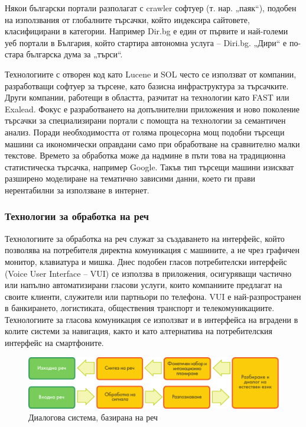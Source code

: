 \begin{multicols}{2}
  Някои български портали разполагат с crawler софтуер (т. нар.
   „паяк“), подобен на използвания от глобалните
   търсачки, който индексира сайтовете, класифицирани в
   категории. Например Dir.bg е един от първите и най-големи уеб портали в България, който стартира
   автономна услуга – Diri.bg. „Дири“ е по-стара българска дума за „търси“. 

  Технологиите с отворен код като
   Lucene и SOL често се използват от компании,
   разработващи софтуер за търсене, като базисна
   инфраструктура за търсачките. Други компании,
   работещи в областта, разчитат на технологии като FAST или Exalead.
  Фокус е разработването на допълнителни приложения и ново поколение търсачки за специализирани портали с помощта на технологии за семантичен анализ. Поради необходимостта от голяма процесорна мощ подобни търсещи машини са икономически оправдани само при обработване на сравнително малки текстове. Времето за обработка може да надмине в пъти това на традиционна статистическа търсачка, например Google. Такъв тип търсещи машини изискват разширено моделиране на тематично зависими данни, което ги прави нерентабилни за използване в интернет.

  \subsubsection{Технологии за обработка на реч}

  Технологиите за обработка на реч служат за създаването на интерфейс, който позволява на потребителя директна комуникация с машините, а не чрез графичен монитор, клавиатура и мишка. Днес подобен гласов
   потребителски интерфейс (Voice User Interface -- VUI) се използва в приложения, осигуряващи частично или напълно
   автоматизирани гласови услуги, които компаниите предлагат на своите клиенти, служители или партньори
   по телефона. VUI е най-разпространен в банкирането, логистиката,
   обществения транспорт и телекомуникациите.
   Технологиите за гласова комуникация се използват и в интерфейса на вградени в колите системи за навигация, както и като алтернатива на потребителския
   интерфейс на смартфоните.

  \begin{figure}[htb]
    \center  \includegraphics[width=\textwidth]{../_media/bulgarian/simple_speech-based_dialogue_architecture}
    \center
    \caption{Диалогова система, базирана на реч}
    \label{fig:dialoguearch_de}
  \end{figure}


\end{multicols}
